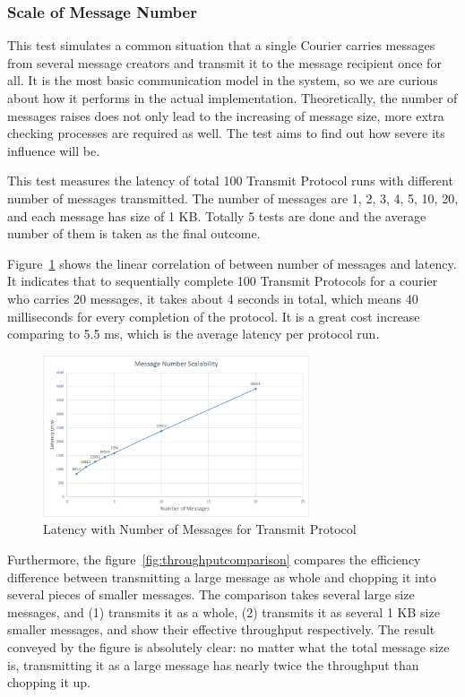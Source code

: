 \subsubsection{Scale of Message Number}
This test simulates a common situation that a single Courier carries messages from several message creators and transmit it to the message recipient once for all. It is the most basic communication model in the system, so we are curious about how it performs in the actual implementation. Theoretically, the number of messages raises does not only lead to the increasing of message size, more extra checking processes are required as well. The test aims to find out how severe its influence will be.

This test measures the latency of total 100 Transmit Protocol runs with different number of messages transmitted. The number of messages are 1, 2, 3, 4, 5, 10, 20, and each message has size of 1 KB. Totally 5 tests are done and the average number of them is taken as the final outcome.

Figure~\ref{fig:messagenumbertransmit} shows the linear correlation of between number of messages and latency. It indicates that to sequentially complete 100 Transmit Protocols for a courier who carries 20 messages, it takes about 4 seconds in total, which means 40 milliseconds for every completion of the protocol. It is a great cost increase comparing to 5.5 ms, which is the average latency per protocol run. 

\begin{figure}[h!]
\centering
\includegraphics[width=0.7\textwidth,natwidth=880,natheight=534]{figures/messagenumbertransmit.png}
\caption{Latency with Number of Messages for Transmit Protocol}
\label{fig:messagenumbertransmit}
\end{figure}

Furthermore, the figure~\ref{fig:throughputcomparison} compares the efficiency difference between transmitting a large message as whole and chopping it into several pieces of smaller messages. The comparison takes several large size messages, and (1) transmits it as a whole, (2) transmits it as several 1 KB size smaller messages, and show their effective throughput respectively. The result conveyed by the figure is absolutely clear: no matter what the total message size is, transmitting it as a large message has nearly twice the throughput than chopping it up.

